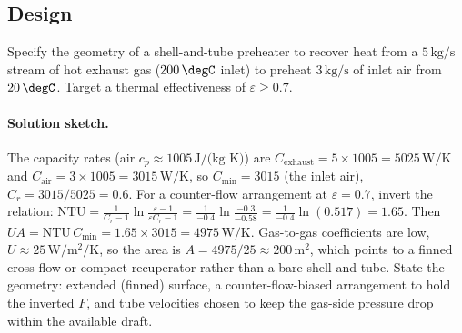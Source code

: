 \subsection*{Design}

\begin{exercise}
Specify the geometry of a shell-and-tube preheater to recover heat
from a $5\,\text{kg/s}$ stream of hot exhaust gas ($200\,\degC$
inlet) to preheat $3\,\text{kg/s}$ of inlet air from $20\,\degC$.
Target a thermal effectiveness of $\varepsilon \geq 0.7$.

\paragraph{Solution sketch.} The capacity rates (air $c_p \approx 1005\,
\text{J/(kg K)}$) are $C_{\text{exhaust}} = 5 \times 1005 = 5025\,
\si{\watt\per\kelvin}$ and $C_{\text{air}} = 3 \times 1005 = 3015\,
\si{\watt\per\kelvin}$, so $C_{\min} = 3015$ (the inlet air), $C_r =
3015/5025 = 0.6$. For a counter-flow arrangement at $\varepsilon =
0.7$, invert the relation: $\text{NTU} = \frac{1}{C_r - 1}\ln\frac{
\varepsilon - 1}{\varepsilon C_r - 1} = \frac{1}{-0.4}\ln\frac{-0.3}{
-0.58} = \frac{1}{-0.4}\ln(0.517) = 1.65$. Then $UA = \text{NTU}\,
C_{\min} = 1.65 \times 3015 = 4975\,\text{W/K}$. Gas-to-gas
coefficients are low, $U \approx 25\,\si{\watt\per\meter\squared\per
\kelvin}$, so the area is $A = 4975/25 \approx 200\,\text{m}^2$, which
points to a finned cross-flow or compact recuperator rather than a bare
shell-and-tube. State the geometry: extended (finned) surface, a
counter-flow-biased arrangement to hold the inverted $F$, and tube
velocities chosen to keep the gas-side pressure drop within the
available draft.
\end{exercise}


